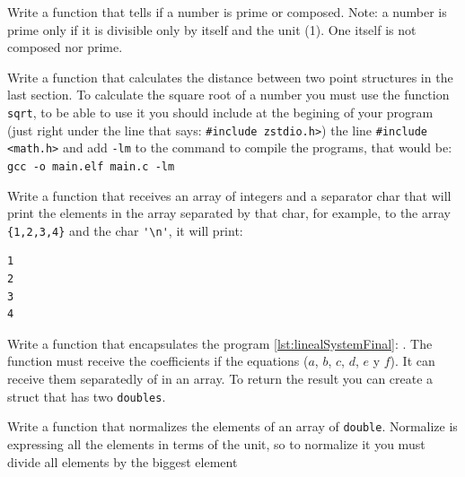\documentclass[a4paper]{article}
\begin{document}
\begin{exercises}[resume*]
\item Write a function that tells if a number is prime or composed. Note: a
number is prime only if it is divisible only by itself and the unit (1). One
itself is not composed nor prime.

\item Write a function that calculates the distance between two point structures
in the last section. To calculate the square root of a number you must use
the function \verb!sqrt!, to be able to use it you should include at the
begining of your program (just right under the line that says:
\verb!#include zstdio.h>!) the line \verb!#include <math.h>! and add \verb!-lm!
to the command to compile the programs, that would be:
\verb!gcc -o main.elf main.c -lm!
\item Write a function that receives an array of integers and a separator char
that will print the elements in the array separated by that char, for example,
to the array \verb!{1,2,3,4}! and the char \verb!'\n'!, it will print:

\begin{minipage}[H]{\linewidth}
\mbox{}
\begin{verbatim}
1
2
3
4
\end{verbatim}
\end{minipage}

\item Write a function that encapsulates the program
\ref{lst:linealSystemFinal}: . The function must
receive the coefficients if the equations ($a$, $b$, $c$, $d$, $e$ y $f$). It
can receive them separatedly of in an array. To return the result you can create
a struct that has two \verb"doubles".
\item Write a function that normalizes the elements of an array of
\verb!double!. Normalize is expressing all the elements in terms of the unit,
so to normalize it you must divide all elements by the biggest element
\end{exercises}
\end{document}
